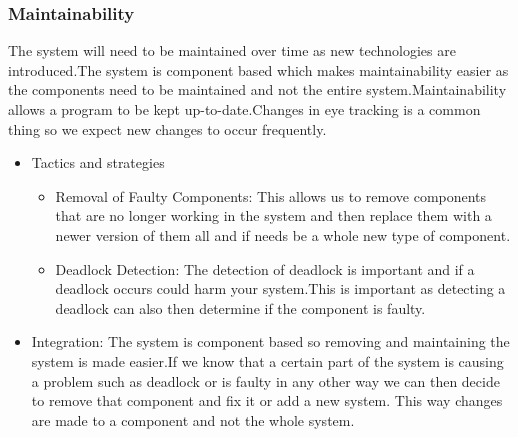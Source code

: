 \subsubsection{Maintainability}
\begin{flushleft}
The system will need to be maintained over time as new technologies are introduced.The system is component based which makes maintainability easier as the components need to be maintained and not the entire system.Maintainability allows a program to be kept up-to-date.Changes in eye tracking is a common thing so we expect new changes to occur frequently.
\begin{itemize}
\item{Tactics and strategies}
\begin{itemize}
\item{Removal of Faulty Components}: This allows us to remove components that are no longer working in the system and then replace them with a newer version of them all and if needs be a whole new type of component.
\item{Deadlock Detection}: The detection of deadlock is important and if a deadlock occurs could harm your system.This is important as detecting a deadlock can also then determine if the component is faulty.
\end{itemize}

\item{Integration}: The system is component based so removing and maintaining the system is made easier.If we know that a certain part of the system is causing a problem such as deadlock or is faulty in any other way we can then  decide to remove that component and fix it or add a new system. This way changes are made to a component and not the whole system.
\end{itemize}

\end{flushleft}
		
